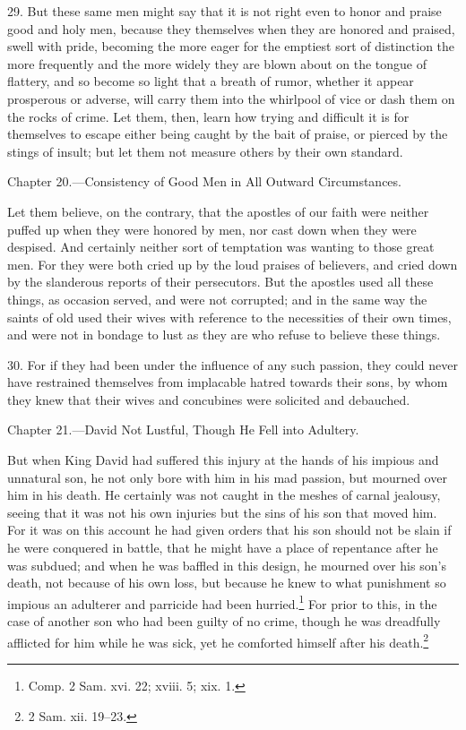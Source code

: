 29. But these same men might say that it is not right even to honor and praise good and holy men, because they themselves when they are honored and praised, swell with pride, becoming the more eager for the emptiest sort of distinction the more frequently and the more widely they are blown about on the tongue of flattery, and so become so light that a breath of rumor, whether it appear prosperous or adverse, will carry them into the whirlpool of vice or dash them on the rocks of crime. Let them, then, learn how trying and difficult it is for themselves to escape either being caught by the bait of praise, or pierced by the stings of insult; but let them not measure others by their own standard.


Chapter 20.—Consistency of Good Men in All Outward Circumstances.

Let them believe, on the contrary, that the apostles of our faith were neither puffed up when they were honored by men, nor cast down when they were despised. And certainly neither sort of temptation was wanting to those great men. For they were both cried up by the loud praises of believers, and cried down by the slanderous reports of their persecutors. But the apostles used all these things, as occasion served, and were not corrupted; and in the same way the saints of old used their wives with reference to the necessities of their own times, and were not in bondage to lust as they are who refuse to believe these things.

30. For if they had been under the influence of any such passion, they could never have restrained themselves from implacable  hatred towards their sons, by whom they knew that their wives and concubines were solicited and debauched.


Chapter 21.—David Not Lustful, Though He Fell into Adultery.

But when King David had suffered this injury at the hands of his impious and unnatural son, he not only bore with him in his mad passion, but mourned over him in his death. He certainly was not caught in the meshes of carnal jealousy, seeing that it was not his own injuries but the sins of his son that moved him. For it was on this account he had given orders that his son should not be slain if he were conquered in battle, that he might have a place of repentance after he was subdued; and when he was baffled in this design, he mourned over his son’s death, not because of his own loss, but because he knew to what punishment so impious an adulterer and parricide had been hurried.\footnote{Comp. 2 Sam. xvi. 22; xviii. 5; xix. 1.} For prior to this, in the case of another son who had been guilty of no crime, though he was dreadfully afflicted for him while he was sick, yet he comforted himself after his death.\footnote{2 Sam. xii. 19–23.}

